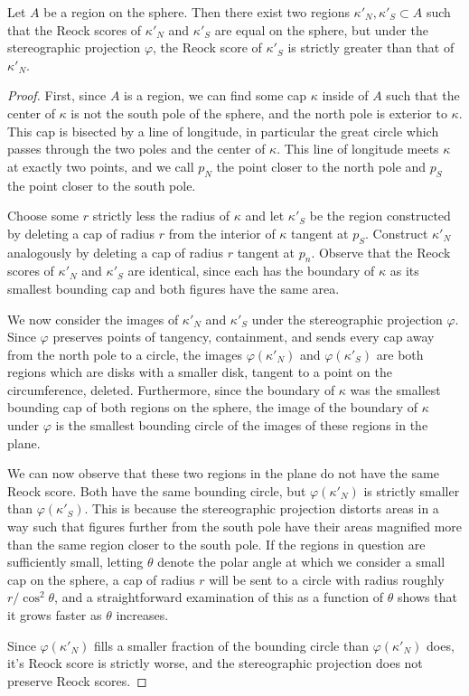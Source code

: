 \begin{theorem}
	Let $A$ be a region on the sphere.  Then there exist two regions $\kappa'_N,\kappa'_S\subset A$ such that the Reock scores of $\kappa'_N$ and $\kappa'_S$ are equal on the sphere, but under the stereographic projection $\varphi$, the Reock score of $\kappa'_S$ is strictly greater than that of $\kappa'_N$. 
\end{theorem}

\begin{proof}
	First, since $A$ is a region, we can find some cap $\kappa$ inside of $A$ such that the center of $\kappa$ is not the south pole of the sphere, and the north pole is exterior to $\kappa$.  This cap is bisected by a line of longitude, in particular the great circle which passes through the two poles and the center of $\kappa$.  This line of longitude meets $\kappa$ at exactly two points, and we call $p_N$ the point closer to the north pole and $p_S$ the point closer to the south pole.
	
	Choose some $r$ strictly less the radius of $\kappa$ and let $\kappa'_S$ be the region constructed by deleting a cap of radius $r$ from the interior of $\kappa$ tangent at $p_S$.  Construct $\kappa'_N$ analogously by deleting a cap of radius $r$ tangent at $p_n$. Observe that the Reock scores of $\kappa'_N$ and $\kappa'_S$ are identical, since each has the boundary of $\kappa$ as its smallest bounding cap and both figures have the same area.
	
	We now consider the images of $\kappa'_N$ and $\kappa'_S$ under the stereographic projection $\varphi$.  Since $\varphi$ preserves points of tangency, containment, and sends every cap away from the north pole to a circle, the images $\varphi(\kappa'_N)$ and $\varphi(\kappa'_S)$ are both regions which are disks with a smaller disk, tangent to a point on the circumference, deleted.  Furthermore, since the boundary of $\kappa$ was the smallest bounding cap of both regions on the sphere, the image of the boundary of $\kappa$ under $\varphi$ is the smallest bounding circle of the images of these regions in the plane.
	
	We can now observe that these two regions in the plane do not have the same Reock score.  Both have the same bounding circle, but $\varphi(\kappa'_N)$ is strictly smaller than $\varphi(\kappa'_S)$.  This is because the stereographic projection distorts areas in a way such that figures further from the south pole have their areas magnified more than the same region closer to the south pole.  If the regions in question are sufficiently small, letting $\theta$ denote the polar angle at which we consider a small cap on the sphere, a cap of radius $r$ will be sent to a circle with radius roughly $r/\cos^2{\theta}$, and a straightforward examination of this as a function of $\theta$ shows that it grows faster as $\theta$ increases.
	
	Since $\varphi(\kappa'_N)$ fills a smaller fraction of the bounding circle than $\varphi(\kappa'_N)$ does, it's Reock score is strictly worse, and the stereographic projection does not preserve Reock scores.
\end{proof}